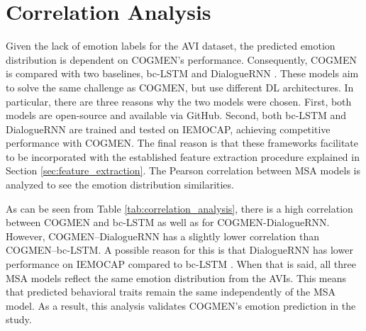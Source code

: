 \section{Correlation Analysis}
Given the lack of emotion labels for the AVI dataset, the predicted emotion distribution is dependent on COGMEN's performance. Consequently, COGMEN is compared with two baselines, bc-LSTM\cite{bc-LSTM_poria2017context} and DialogueRNN \cite{DialogueRNN_real}. These models aim to solve the same challenge as COGMEN, but use different DL architectures. In particular, there are three reasons why the two models were chosen. First, both models are open-source and available via GitHub. Second, both bc-LSTM and DialogueRNN are trained and tested on IEMOCAP, achieving competitive performance with COGMEN. The final reason is that these frameworks facilitate to be incorporated with the established feature extraction procedure explained in Section \ref{sec:feature_extraction}. The Pearson correlation between MSA models is analyzed to see the emotion distribution similarities. 
%
\begin{table}[h]
\caption{Correlation for emotions distribution between MSA models.}
\centering
{}
\label{tab:correlation_analysis}
\end{table}
%
As can be seen from Table \ref{tab:correlation_analysis}, there is a high correlation between COGMEN and bc-LSTM as well as for COGMEN-DialogueRNN. However, COGMEN--DialogueRNN has a slightly lower correlation than COGMEN--bc-LSTM. A possible reason for this is that DialogueRNN has lower performance on IEMOCAP compared to bc-LSTM \cite{COGMEN_joshi-etal-2022-cogmen}. When that is said, all three MSA models reflect the same emotion distribution from the AVIs. This means that predicted behavioral traits remain the same independently of the MSA model. As a result, this analysis validates COGMEN's emotion prediction in the study. 

